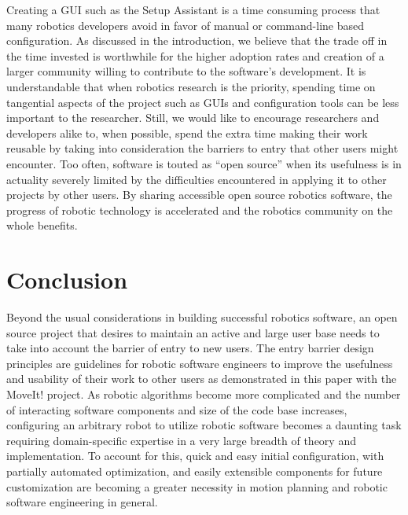 \documentclass[10pt,journal,compsoc]{joser1}
\begin{document}
{Creating a GUI such as the Setup Assistant is a time consuming process that many robotics developers avoid in favor of manual or command-line based configuration. As discussed in the introduction, we believe that the trade off in the time invested is worthwhile for the higher adoption rates and creation of a larger community willing to contribute to the software's development. It is understandable that when robotics research is the priority, spending time on tangential aspects of the project such as GUIs and configuration tools can be less important to the researcher. Still, we would like to encourage researchers and developers alike to, when possible, spend the extra time making their work reusable by taking into consideration the barriers to entry that other users might encounter. Too often, software is touted as ``open source'' when its usefulness is in actuality severely limited by the difficulties encountered in applying it to other projects by other users. By sharing accessible open source robotics 
software, the progress of robotic technology is accelerated and the robotics community on the whole benefits.

\section{Conclusion}
\label{sec::conclusion}

Beyond the usual considerations in building successful robotics software, an open source project that desires to maintain an active and large user base needs to take into account the barrier of entry to new users. The entry barrier design principles are guidelines for robotic software engineers to improve the usefulness and usability of their work to other users as demonstrated in this paper with the MoveIt! project. As robotic algorithms become more complicated and the number of interacting software components and size of the code base increases, configuring an arbitrary robot to utilize robotic software becomes a daunting task requiring domain-specific expertise in a very large breadth of theory and implementation. To account for this, quick and easy initial configuration, with partially automated optimization, and easily extensible components for future customization are becoming a greater necessity in motion planning and robotic software engineering in general. 

}
\end{document}
